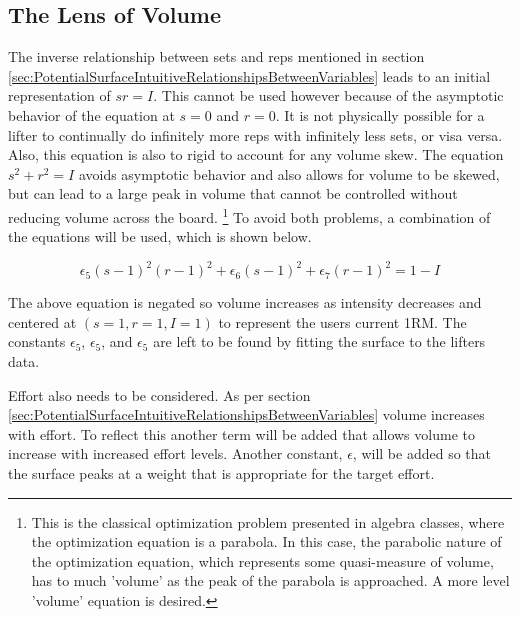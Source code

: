 \subsection{The Lens of Volume}
\label{sec:PotentialSurfaceLensOfVolume}

The inverse relationship between sets and reps mentioned in section \ref{sec:PotentialSurfaceIntuitiveRelationshipsBetweenVariables} leads to an initial representation of $sr=I$. This cannot be used however because of the asymptotic behavior of the equation at $s=0$ and $r=0$. It is not physically possible for a lifter to continually do infinitely more reps with infinitely less sets, or visa versa. Also, this equation is also to rigid to account for any volume skew. The equation $s^2+r^2=I$ avoids asymptotic behavior and also allows for volume to be skewed, but can lead to a large peak in volume that cannot be controlled without reducing volume across the board. \footnote{This is the classical optimization problem presented in algebra classes, where the optimization equation is a parabola. In this case, the parabolic nature of the optimization equation, which represents some quasi-measure of volume, has to much 'volume' as the peak of the parabola is approached. A more level 'volume' equation is desired.} To avoid both problems, a combination of the equations will be used, which is shown below.


\begin{equation*}
    \epsilon_5 (s-1)^2(r-1)^2+\epsilon_6 (s-1)^2+\epsilon_7 (r-1)^2=1-I
\end{equation*}

The above equation is negated so volume increases as intensity decreases and centered at $(s=1,r=1,I=1)$ to represent the users current 1RM. The constants $\epsilon_5$, $\epsilon_5$, and $\epsilon_5$ are left to be found by fitting the surface to the lifters data.

Effort also needs to be considered. As per section \ref{sec:PotentialSurfaceIntuitiveRelationshipsBetweenVariables} volume increases with effort. To reflect this another term will be added that allows volume to increase with increased effort levels. Another constant, $\epsilon$, will be added so that the surface peaks at a weight that is appropriate for the target effort.

